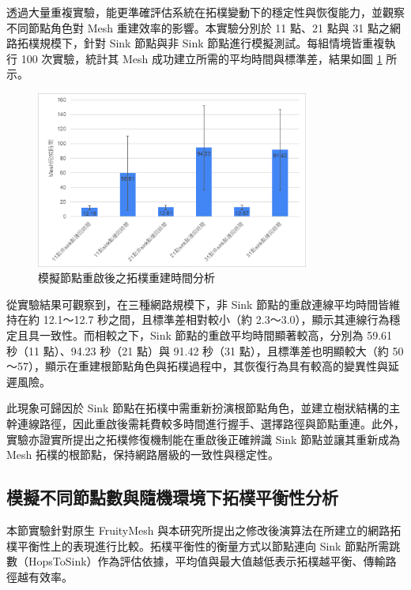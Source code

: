 \begin{ZhChapter}
透過大量重複實驗，能更準確評估系統在拓樸變動下的穩定性與恢復能力，並觀察不同節點角色對 Mesh 重建效率的影響。本實驗分別於 11 點、21 點與 31 點之網路拓樸規模下，針對 Sink 節點與非 Sink 節點進行模擬測試。每組情境皆重複執行 100 次實驗，統計其 Mesh 成功建立所需的平均時間與標準差，結果如圖 \ref{fig: 節點重啟後之拓樸重建時間分析} 所示。

\begin{figure}[H]
    \centering
    \includegraphics[width = 0.8\textwidth]{image/節點重啟後之拓樸重建時間分析.png}
    \caption{模擬節點重啟後之拓樸重建時間分析}
    \label{fig: 節點重啟後之拓樸重建時間分析}
\end{figure}

從實驗結果可觀察到，在三種網路規模下，非 Sink 節點的重啟連線平均時間皆維持在約 12.1～12.7 秒之間，且標準差相對較小（約 2.3～3.0），顯示其連線行為穩定且具一致性。而相較之下，Sink 節點的重啟平均時間顯著較高，分別為 59.61 秒（11 點）、94.23 秒（21 點）與 91.42 秒（31 點），且標準差也明顯較大（約 50～57），顯示在重建根節點角色與拓樸過程中，其恢復行為具有較高的變異性與延遲風險。

此現象可歸因於 Sink 節點在拓樸中需重新扮演根節點角色，並建立樹狀結構的主幹連線路徑，因此重啟後需耗費較多時間進行握手、選擇路徑與節點重連。此外，實驗亦證實所提出之拓樸修復機制能在重啟後正確辨識 Sink 節點並讓其重新成為 Mesh 拓樸的根節點，保持網路層級的一致性與穩定性。

\subsection{模擬不同節點數與隨機環境下拓樸平衡性分析}
本節實驗針對原生 FruityMesh 與本研究所提出之修改後演算法在所建立的網路拓樸平衡性上的表現進行比較。拓樸平衡性的衡量方式以節點連向 Sink 節點所需跳數（HopsToSink）作為評估依據，平均值與最大值越低表示拓樸越平衡、傳輸路徑越有效率。


\end{ZhChapter}
